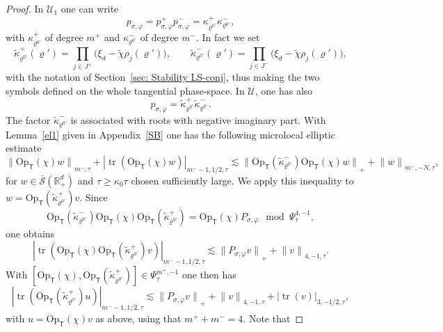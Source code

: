 \documentclass[10pt]{amsart}
\theoremstyle{plain}
\theoremstyle{definition}
\def\R{\mathbb{R}}
\newcommand{\suff}{sufficiently\xspace}
\let\k\kappa
\let\y\varrho
\newcommand{\tk}{\tilde{\kappa}}
\newcommand{\tchi}{\tilde{\chi}}
\newcommand{\U}{\mathscr U}
\newcommand{\Opt}{\ensuremath{\mathrm{Op}_{\scriptscriptstyle{\mathsf{T}}}}}
\newcommand{\Norm}[2]{{\| #1 \|}_{#2}}
\newcommand{\Normsc}[2]{{\| #1 \|}_{#2, \tau}}
\newcommand{\normsc}[2]{{| #1 |}_{#2, \tau}}
\newcommand{\Psisc}{\Psi_\tau}
\newcommand{\Pconj}{P_{\sigma,\varphi}}
\newcommand{\pconj}{p_{\sigma,\varphi}}
\newcommand{\Sbarp}{\ensuremath{\overline{\mathscr{S}}(\Rdp)}}
\newcommand{\Rdp}{\R^d_+}
\DeclareMathOperator{\trace}{tr}
\begin{document}
\begin{proof}
In $\U_1$ one can write\vspace*{-3pt}
\begin{equation*}
\pconj = \pconj^+ \pconj^-
= \k^+_{\y^{0\prime}} \k^-_{\y^{0\prime}},
\end{equation*}
with $\k^+_{\y^{0\prime}}$ of degree $m^+$ and $\k^-_{\y^{0\prime}}$
of degree $m^-$.
In fact we set
\begin{equation*}
\tk^+_{\y^{0\prime}} (\y')
= \prod_{j \in J^+} \big(\xi_d -\tchi \rho_j(\y')\big),
\qquad
\tk^-_{\y^{0\prime}} (\y')
= \prod_{j \in J^-} \big(\xi_d -\tchi \rho_j(\y')\big),
\end{equation*}
with the notation of Section~\ref{sec: Stability LS-conj},
thus making the two symbols defined on
the whole tangential phase-space.
In $\U$, one has also\vspace*{-3pt}
\begin{equation*}
\pconj
= \tk^+_{\y^{0\prime}} \tk^-_{\y^{0\prime}}.
\end{equation*}
The factor $\tk^-_{\y^{0\prime}}$ is associated with roots with
negative imaginary part. With Lemma~\ref{el1} given in
Appendix~\ref{SB} one has the following microlocal elliptic esti\-mate\vspace*{-3pt}
\[
\Normsc{\Opt(\chi)w}{m^-}
+ \normsc{\trace(\Opt(\chi)w)}{m^--1, 1/2}
\lesssim
\Norm{\Opt(\tk^-_{\y^{0\prime}}) \Opt(\chi)w}{+}
+ \Normsc{w}{m^-,-N},
\]
for $w \in \Sbarp$ and $\tau \geq \k_0 \tau$ chosen \suff large.
We apply this inequality to $w=\Opt(\tk^+_{\y^{0\prime}})v$.
Since\vspace*{-3pt}
\begin{equation*}
\Opt(\tk^-_{\y^{0\prime}}) \Opt(\chi)\Opt(\tk^+_{\y^{0\prime}}) =
\Opt(\chi) \Pconj \mod \Psisc^{4,-1},
\end{equation*}
one obtains\vspace*{-3pt}
\begin{equation*}
\normsc{\trace(\Opt(\chi) \Opt(\tk^+_{\y^{0\prime}})v)}{m^--1, 1/2}
\lesssim
\Norm{\Pconj v}{+}
+ \Normsc{v}{4,-1}.
\end{equation*}
With $[\Opt(\chi), \Opt(\tk^+_{\y^{0\prime}})] \in \Psisc^{m^+,-1}$ one
then has\vspace*{-3pt}
\begin{equation*}
\normsc{\trace(\Opt(\tk^+_{\y^{0\prime}}) u)}{m^--1, 1/2}
\lesssim
\Norm{\Pconj v}{+}
+ \Normsc{v}{4,-1}
+ \normsc{\trace(v)}{3,-1/2},
\end{equation*}
with $u= \Opt(\chi) v$ as above, using that $m^+ + m^-=4$.
Note that\vspace*{-3pt}

\end{proof}
\end{document}
